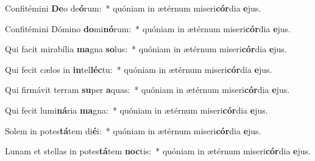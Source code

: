 \item Confitémini \textbf{De}o de\textbf{ó}rum:~* quóniam in ætérnum miseri\textbf{cór}dia \textbf{e}jus.
\item Confitémini Dómino \textbf{do}mi\textbf{nó}rum:~* quóniam in ætérnum miseri\textbf{cór}dia \textbf{e}jus.
\item Qui facit mirabília \textbf{ma}gna \textbf{so}lus:~* quóniam in ætérnum miseri\textbf{cór}dia \textbf{e}jus.
\item Qui fecit cælos in \textbf{in}tel\textbf{léc}tu:~* quóniam in ætérnum miseri\textbf{cór}dia \textbf{e}jus.
\item Qui firmávit terram \textbf{su}per \textbf{a}quas:~* quóniam in ætérnum miseri\textbf{cór}dia \textbf{e}jus.
\item Qui fecit lumi\textbf{ná}ria \textbf{ma}gna:~* quóniam in ætérnum miseri\textbf{cór}dia \textbf{e}jus.
\item Solem in potes\textbf{tá}tem di\textbf{é}i:~* quóniam in ætérnum miseri\textbf{cór}dia \textbf{e}jus.
\item Lunam et stellas in potes\textbf{tá}tem \textbf{noc}tis:~* quóniam in ætérnum miseri\textbf{cór}dia \textbf{e}jus.
